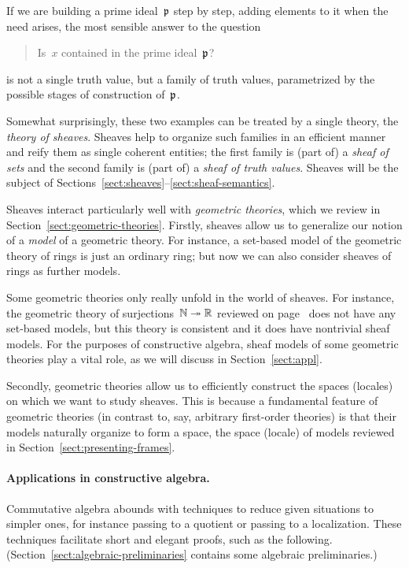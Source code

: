 \documentclass{ws-rv9x6}
\begin{document}
{If we are building a prime ideal~$\mathfrak{p}$ step by step, adding elements to it
when the need arises, the most sensible answer to the question
\begin{quote}
Is~$x$ contained in the prime ideal~$\mathfrak{p}$?
\end{quote}
is not a single truth value, but a family of truth values, parametrized by the
possible stages of construction of~$\mathfrak{p}$.

Somewhat surprisingly, these two examples can be treated by a single theory,
the \emph{theory of sheaves}. Sheaves help to organize such families in an
efficient manner and reify them as single coherent entities; the first family
is (part of) a \emph{sheaf of sets} and the second family is (part of) a
\emph{sheaf of truth values}. Sheaves will be the subject of
Sections~\ref{sect:sheaves}--\ref{sect:sheaf-semantics}.

Sheaves interact particularly well with \emph{geometric theories}, which we
review in Section~\ref{sect:geometric-theories}. Firstly, sheaves allow us to
generalize our notion of a \emph{model} of a geometric theory. For instance, a
set-based model of the geometric theory of rings is just an ordinary ring; but
now we can also consider sheaves of rings as further models.

Some geometric theories only really unfold in the world of sheaves. For
instance, the geometric theory of surjections~$\mathbb{N} \twoheadrightarrow \mathbb{R}$
reviewed on page~\pageref{item:theory-of-surjections} does not have any
set-based models, but this theory is consistent and it does have nontrivial sheaf
models. For the purposes of constructive algebra, sheaf models of some geometric
theories play a vital role, as we will discuss in Section~\ref{sect:appl}.

Secondly, geometric theories allow us to efficiently construct the spaces
(locales) on which we want to study sheaves. This is because a fundamental
feature of geometric theories (in contrast to, say, arbitrary first-order
theories) is that their models naturally organize to form a space, the
space (locale) of models reviewed in Section~\ref{sect:presenting-frames}.



\paragraph{Applications in constructive algebra.}
\label{par:appl-constr-alg}
Commutative algebra abounds with techniques to reduce given situations to
simpler ones, for instance passing to a quotient or passing to a
localization. These techniques facilitate short and elegant proofs, such as the
following. (Section~\ref{sect:algebraic-preliminaries} contains some algebraic
preliminaries.)

}
\end{document}
